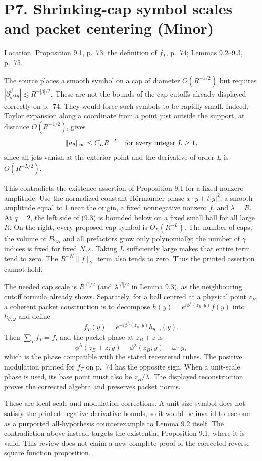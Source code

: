 \documentclass[10pt]{article}
\begin{document}
\section*{P7. Shrinking-cap symbol scales and packet centering (Minor)}
Location. Proposition 9.1, p. 73; the definition of \(f_T\), p. 74; Lemmas 9.2–9.3, p. 75.\par
The source places a smooth symbol on a cap of diameter \(O(R^{-1/2})\) but requires \(|\partial_y^\beta a_\theta|\lesssim R^{-|\beta|/2}\). These are not the bounds of the cap cutoffs already displayed correctly on p. 74. They would force such symbols to be rapidly small. Indeed, Taylor expansion along a coordinate from a point just outside the support, at distance \(O(R^{-1/2})\), gives \[\|a_\theta\|_\infty\leq C_L R^{-L}
 \quad\hbox{for every integer }L\geq1,\] since all jets vanish at the exterior point and the derivative of order \(L\) is \(O(R^{-L/2})\).\par
This contradicts the existence assertion of Proposition 9.1 for a fixed nonzero amplitude. Use the normalized constant Hörmander phase \(x\cdot y+t|y|^2\), a smooth amplitude equal to 1 near the origin, a fixed nonnegative nonzero \(f\), and \(\lambda=R\). At \(q=2\), the left side of (9.3) is bounded below on a fixed small ball for all large \(R\). On the right, every proposed cap symbol is \(O_L(R^{-L})\). The number of caps, the volume of \(B_{2R}\) and all prefactors grow only polynomially; the number of \(\gamma\) indices is fixed for fixed \(N,\varepsilon\). Taking \(L\) sufficiently large makes that entire term tend to zero. The \(R^{-N}\|f\|_2\) term also tends to zero. Thus the printed assertion cannot hold.\par
The needed cap scale is \(R^{|\beta|/2}\) (and \(\lambda^{|\beta|/2}\) in Lemma 9.3), as the neighbouring cutoff formula already shows. Separately, for a ball centred at a physical point \(z_B\), a coherent packet construction is to decompose \(h(y)=e^{i\phi^\lambda(z_B;y)}f(y)\) into \(h_{\theta,\omega}\) and define \[f_T(y)=e^{-i\phi^\lambda(z_B;y)}h_{\theta,\omega}(y).\] Then \(\sum_T f_T=f\), and the packet phase at \(z_B+z\) is \[\phi^\lambda(z_B+z;y)-\phi^\lambda(z_B;y)-\omega\cdot y,\] which is the phase compatible with the stated recentered tubes. The positive modulation printed for \(f_T\) on p. 74 has the opposite sign. When a unit-scale phase is used, its base point must also be \(z_B/\lambda\). The displayed reconstruction proves the corrected algebra and preserves packet norms.\par
These are local scale and modulation corrections. A unit-size symbol does not satisfy the printed negative derivative bounds, so it would be invalid to use one as a purported all-hypothesis counterexample to Lemma 9.2 itself. The contradiction above instead targets the existential Proposition 9.1, where it is valid. This review does not claim a new complete proof of the corrected reverse square function proposition.\par
\end{document}
